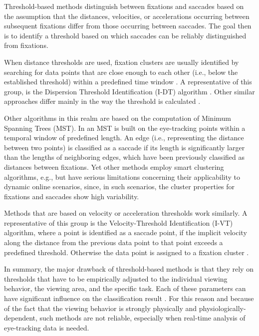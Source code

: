 \documentclass[preprint,12pt]{elsarticle}
\begin{document}
Threshold-based methods distinguish between fixations and saccades based on the assumption that the distances, velocities, or accelerations occurring between subsequent fixations differ from those occurring between saccades.
The goal then is to identify a threshold based on which saccades can be reliably distinguished from fixations.

When distance thresholds are used, fixation clusters are usually identified by searching for data points that are close enough to each other (i.e., below the established threshold) within a predefined time window \cite{holmqvist-eye-tracking-a-comprehensive-guide-to-methods-and-measures}.
A representative of this group, is the Dispersion Threshold Identification (I-DT) algorithm \cite{Salvucci:2000:IFS:355017.355028}.
Other similar approaches differ mainly in the way the threshold is calculated \cite{Blignaut2009, Shic:2008:IFM:1344471.1344500}.

Other algorithms in this realm are based on the computation of Minimum Spanning Trees (MST).
In \cite{Salvucci:2000:IFS:355017.355028} an MST is built on the eye-tracking points within a temporal window of predefined length.
An edge (i.e., representing the distance between two points) is classified as a saccade if its length is significantly larger than the lengths of neighboring edges,
which have been previously classified as distances between fixations.
Yet other methods employ smart clustering algorithms, e.g., \cite{Santella:2004:RCE:968363.968368, Urruty:2007:DEF:1314303.1314308}
but have serious limitations concerning their applicability to dynamic online scenarios,
since, in such scenarios, the cluster properties for fixations and saccades show high variability.

Methods that are based on velocity or acceleration thresholds work similarly.
A representative of this group is the Velocity-Threshold Identification (I-VT) algorithm,
where a point is identified as a saccade point,
if the implicit velocity along the distance from the previous data point to that point exceeds a predefined threshold.
Otherwise the data point is assigned to a fixation cluster \cite{Salvucci:2000:IFS:355017.355028}.

In summary, the major drawback of threshold-based methods is that they rely on thresholds that have to be empirically adjusted to the individual viewing behavior,
the viewing area, and the specific task.
Each of these parameters can have significant influence on the classification result \cite{Komogortsev2013, Salvucci:2000:IFS:355017.355028}.
For this reason and because of the fact that the viewing behavior is strongly physically and physiologically-dependent, such methods are not reliable, especially when real-time analysis of eye-tracking data is needed.
\end{document}
